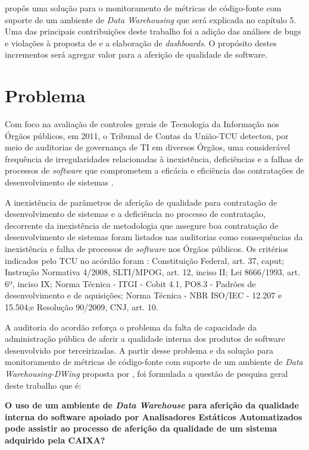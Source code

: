  propôs uma solução para o monitoramento de métricas de código-fonte com suporte de um ambiente de \textit{Data Warehousing} que será explicada no capítulo 5. Uma das principais contribuições deste trabalho foi a adição das análises de bugs e violações à proposta de  e a elaboração de \textit{dashboards}. O propósito destes incrementos será agregar valor para a aferição de qualidade de software. 


\section{Problema}
\label{problema} 

Com foco na avaliação de controles gerais de Tecnologia da Informação nos Órgãos públicos, em 2011, o Tribunal de Contas da União-TCU detectou, por meio de auditorias de governança de TI em diversos Órgãos, uma considerável frequência de irregularidades relacionadas à inexistência, deficiências e a falhas de processos de \textit{software} que comprometem a eficácia e eficiência das contratações de desenvolvimento de sistemas \cite{Acordao381_2011}. 

A inexistência de parâmetros de aferição de qualidade para contratação de desenvolvimento de sistemas e a deficiência no processo de contratação, decorrente da inexistência de metodologia que assegure boa contratação de desenvolvimento de sistemas foram listados nas auditorias como consequências da inexistência e falha de processos de \textit{software} nos Órgãos públicos. Os critérios indicados pelo TCU no acórdão \cite{Acordao381_2011} foram : Constituição Federal, art. 37, caput; Instrução Normativa 4/2008, SLTI/MPOG, art. 12, inciso II; Lei 8666/1993, art. 6º, inciso IX; Norma Técnica - ITGI - Cobit 4.1, PO8.3 - Padrões de desenvolvimento e de aquisições; Norma Técnica - NBR ISO/IEC - 12.207 e 15.504;e Resolução 90/2009, CNJ, art. 10. 

A auditoria do acordão \cite{Acordao381_2011} reforça o problema da falta de capacidade da administração pública de aferir a qualidade interna dos produtos de software desenvolvido por terceirizadas. A partir desse problema e da solução para monitoramento de métricas de código-fonte com suporte de um ambiente de \textit{Data Warehousing-DWing} proposta por , foi formulada a questão de pesquisa geral deste trabalho que é:

\textbf{O uso de um ambiente de \textit{Data Warehouse} para aferição da qualidade interna do software apoiado por Analisadores Estáticos Automatizados pode assistir ao processo de aferição da qualidade de um sistema adquirido pela CAIXA?}


